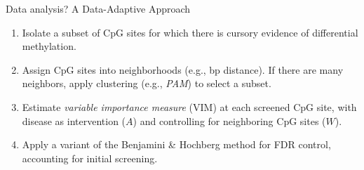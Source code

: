 \documentclass[12pt,t,handout]{beamer}
\begin{document}
\begin{frame}[c]{Data analysis? A Data-Adaptive Approach}

\begin{center}
\begin{enumerate}
  \itemsep8pt
  \item Isolate a subset of CpG sites for which there is cursory evidence of
    differential methylation.
  \item Assign CpG sites into neighborhoods (e.g., bp distance). If there are
    many neighbors, apply clustering (e.g., \textit{PAM}) to select a subset.
  \item Estimate \textit{variable importance measure} (VIM) at each screened CpG
    site, with disease as intervention ($A$) and controlling for neighboring CpG
    sites ($W$).
  \item Apply a variant of the Benjamini \& Hochberg method for FDR control,
    accounting for initial screening.
\end{enumerate}
\end{center}


\end{frame}

\end{document}
